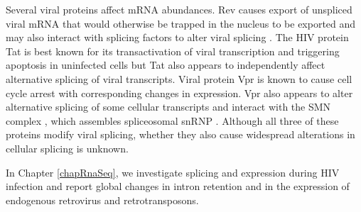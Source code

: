 \documentclass[../sherrill-Mix_thesis.tex]{subfiles}
\begin{document}
	Several viral proteins affect mRNA abundances. Rev causes export of unspliced viral mRNA that would otherwise be trapped in the nucleus \citep{Legrain1989} to be exported \citep{Fischer1994,Pollard1998} and may also interact with splicing factors to alter viral splicing \citep{Tange1996}. The HIV protein Tat is best known for its transactivation of viral transcription \citep{Sodroski1985,Jones1994} and triggering apoptosis in uninfected cells \citep{McCloskey1997,Campbell2004} but Tat also appears to independently affect alternative splicing of viral transcripts\citep{Berro2006,Bohne2007,Jablonski2010,Miller2011}. Viral protein Vpr is known to cause cell cycle arrest \citep{Rogel1995} with corresponding changes in expression. Vpr also appears to alter alternative splicing of some cellular transcripts \citep{Kuramitsu2005,Hashizume2007} and interact with the SMN complex \citep{Jager2012}, which assembles spliceosomal snRNP \citep{Gubitz2004}. Although all three of these proteins modify viral splicing, whether they also cause widespread alterations in cellular splicing is unknown.

	In Chapter \ref{chapRnaSeq}, we investigate splicing and expression during HIV infection and report global changes in intron retention and in the expression of endogenous retrovirus and retrotransposons.
	


\end{document}
